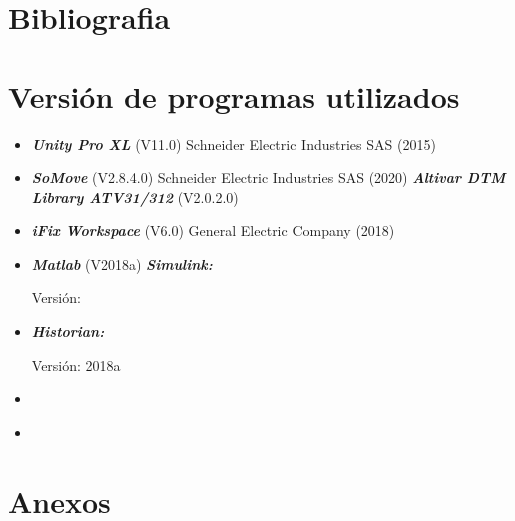 \documentclass[12pt,a4paper]{article}
\begin{document}
\newpage
\section{Bibliografia}


\printbibliography

\section*{Versión de programas utilizados}

\begin{itemize}
	\item \textbf{\textit{Unity Pro XL}} (V11.0) Schneider Electric Industries SAS (2015) 
	\item \textbf{\textit{SoMove}} (V2.8.4.0) Schneider Electric Industries SAS (2020)  
	\subitem \textbf{\textit{Altivar DTM Library ATV31/312}} (V2.0.2.0) 
	\item \textbf{\textit{iFix Workspace}} (V6.0) General Electric Company (2018) 
	\item \textbf{\textit{Matlab}} (V2018a)
	\subitem \textbf{\textit{Simulink:}} 
	
	Versión:	
	\item \textbf{\textit{Historian:}} 
	
	Versión: 2018a
	\item \textbf{\textit{}}
	\item \textbf{\textit{}}
	
\end{itemize}

\section{Anexos}

\end{document}
